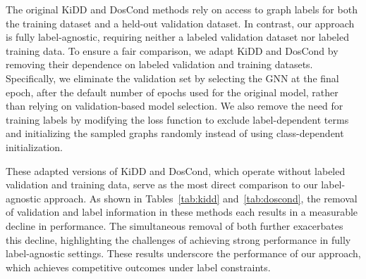 The original KiDD and DosCond methods rely on access to graph labels for both the training dataset and a held-out validation dataset. In contrast, our approach is fully label-agnostic, requiring neither a labeled validation dataset nor labeled training data. To ensure a fair comparison, we adapt KiDD and DosCond by removing their dependence on labeled validation and training datasets. Specifically, we eliminate the validation set by selecting the GNN at the final epoch, after the default number of epochs used for the original model, rather than relying on validation-based model selection. We also remove the need for training labels by modifying the loss function to exclude label-dependent terms and initializing the sampled graphs randomly instead of using class-dependent initialization.

These adapted versions of KiDD and DosCond, which operate without labeled validation and training data, serve as the most direct comparison to our label-agnostic approach. As shown in Tables~\ref{tab:kidd} and~\ref{tab:doscond}, the removal of validation and label information in these methods each results in a measurable decline in performance. The simultaneous removal of both further exacerbates this decline, highlighting the challenges of achieving strong performance in fully label-agnostic settings. These results underscore the performance of our approach, which achieves competitive outcomes under label constraints.


